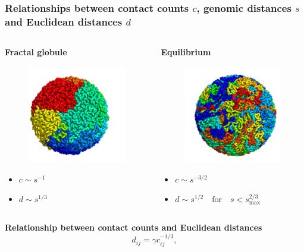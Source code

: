 \documentclass[xcolor=dvipsnames]{beamer}
\begin{document}
\begin{frame}
\frametitle{Relationships between contact counts $c$, genomic distances $s$
and Euclidean distances $d$}
\begin{columns}
\begin{column}{0.5\textwidth}
\begin{center}
\textbf{Fractal globule}
\begin{figure}
\includegraphics[scale=0.3]{figures/mirny_fractal.png}
\end{figure}
\end{center}
\begin{itemize}[label={$\bullet$}]
  \item $c \sim s^{-1}$
  \item $d \sim s^{1 / 3}$
\end{itemize}
\end{column}

\begin{column}{0.5\textwidth}
\begin{center}
\textbf{Equilibrium}
\begin{figure}
\includegraphics[scale=0.3]{figures/mirny_equilibrium.png}
\end{figure}
\end{center}
\begin{itemize}[label={$\bullet$}]
  \item $c \sim s^{-3 / 2}$
  \item $d \sim s^{ 1 / 2} \quad \text{for} \quad s < s_{\text{max}}^{2 / 3}$
\end{itemize}
\end{column}
\end{columns}

\vspace{2em}
{\bf \color{Blue} Relationship between contact counts and Euclidean distances}
\\
\begin{equation*}
d_{ij} = \gamma c_{ij} ^{-1/3},
\end{equation*}


\end{frame}
\end{document}
